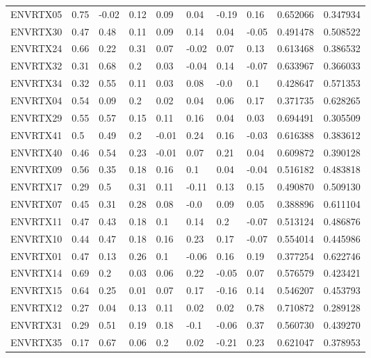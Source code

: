 \begin{landscape}
\begin{longtable}{llllllllll}
ENVRTX05 & \cellcolor{yellow}0.75 & -0.02 & 0.12 & 0.09 & 0.04 & -0.19 & 0.16 & 0.652066 & 0.347934 \\
ENVRTX30 & 0.47 & 0.48 & 0.11 & 0.09 & 0.14 & 0.04 & -0.05 & 0.491478 & 0.508522 \\
ENVRTX24 & \cellcolor{yellow}0.66 & 0.22 & 0.31 & 0.07 & -0.02 & 0.07 & 0.13 & 0.613468 & 0.386532 \\
ENVRTX32 & 0.31 & \cellcolor{yellow}0.68 & 0.2 & 0.03 & -0.04 & 0.14 & -0.07 & 0.633967 & 0.366033 \\
ENVRTX34 & 0.32 & \cellcolor{yellow}0.55 & 0.11 & 0.03 & 0.08 & -0.0 & 0.1 & 0.428647 & 0.571353 \\
ENVRTX04 & \cellcolor{yellow}0.54 & 0.09 & 0.2 & 0.02 & 0.04 & 0.06 & 0.17 & 0.371735 & 0.628265 \\
ENVRTX29 & \cellcolor{yellow}0.55 & \cellcolor{yellow}0.57 & 0.15 & 0.11 & 0.16 & 0.04 & 0.03 & 0.694491 & 0.305509 \\
ENVRTX41 & 0.5 & 0.49 & 0.2 & -0.01 & 0.24 & 0.16 & -0.03 & 0.616388 & 0.383612 \\
ENVRTX40 & 0.46 & \cellcolor{yellow}0.54 & 0.23 & -0.01 & 0.07 & 0.21 & 0.04 & 0.609872 & 0.390128 \\
ENVRTX09 & \cellcolor{yellow}0.56 & 0.35 & 0.18 & 0.16 & 0.1 & 0.04 & -0.04 & 0.516182 & 0.483818 \\
ENVRTX17 & 0.29 & 0.5 & 0.31 & 0.11 & -0.11 & 0.13 & 0.15 & 0.490870 & 0.509130 \\
ENVRTX07 & 0.45 & 0.31 & 0.28 & 0.08 & -0.0 & 0.09 & 0.05 & 0.388896 & 0.611104 \\
ENVRTX11 & 0.47 & 0.43 & 0.18 & 0.1 & 0.14 & 0.2 & -0.07 & 0.513124 & 0.486876 \\
ENVRTX10 & 0.44 & 0.47 & 0.18 & 0.16 & 0.23 & 0.17 & -0.07 & 0.554014 & 0.445986 \\
ENVRTX01 & 0.47 & 0.13 & 0.26 & 0.1 & -0.06 & 0.16 & 0.19 & 0.377254 & 0.622746 \\
ENVRTX14 & \cellcolor{yellow}0.69 & 0.2 & 0.03 & 0.06 & 0.22 & -0.05 & 0.07 & 0.576579 & 0.423421 \\
ENVRTX15 & \cellcolor{yellow}0.64 & 0.25 & 0.01 & 0.07 & 0.17 & -0.16 & 0.14 & 0.546207 & 0.453793 \\
ENVRTX12 & 0.27 & 0.04 & 0.13 & 0.11 & 0.02 & 0.02 & \cellcolor{yellow}0.78 & 0.710872 & 0.289128 \\
ENVRTX31 & 0.29 & \cellcolor{yellow}0.51 & 0.19 & 0.18 & -0.1 & -0.06 & 0.37 & 0.560730 & 0.439270 \\
ENVRTX35 & 0.17 & \cellcolor{yellow}0.67 & 0.06 & 0.2 & 0.02 & -0.21 & 0.23 & 0.621047 & 0.378953 \\

\end{longtable}
\end{landscape}
